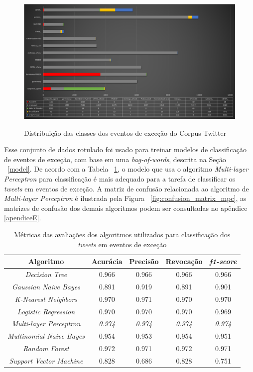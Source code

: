 \documentclass[
	12pt,				%
	oneside,			%
	a4paper,			%
	english,			%
	brazil				%
	]{abntex2ppgsi}
\begin{document}
\begin{figure}[!htb]
	\centering
 	  \caption{Distribuição das classes dos eventos de exceção do Corpus Twitter}
		\includegraphics[width=1\linewidth]{images/tweets_distribution.png}
	\label{fig:tweets_distribution}
\end{figure}

Esse conjunto de dados rotulado foi usado para treinar modelos de classificação de eventos de exceção, com base em uma \textit{bag-of-words}, descrita na Seção ~\ref{model}. De acordo com a Tabela ~\ref{tab:metrics}, o modelo que usa o algoritmo \textit{Multi-layer Perceptron} para classificação é mais adequado para a tarefa de classificar os \textit{tweets} em eventos de exceção. A matriz de confusão relacionada ao algoritmo de \textit{Multi-layer Perceptron} é ilustrada pela Figura ~\ref{fig:confusion_matrix_mpc}, as matrizes de confusão dos demais algoritmos podem ser consultadas no apêndice \ref{apendiceE}.

\begin{table}[!htb]
\centering
\caption {Métricas das avaliações dos algoritmos utilizados para classificação dos \textit{tweets} em eventos de exceção}
\label {tab:metrics}
\begin{tabular}{c|c|c|c|c}
\hline
\textbf{Algoritmo} & \textbf{Acurácia} & \textbf{Precisão} & \textbf{Revocação} & \textbf{\textit{f1-score}} \\
\hline
\textit{Decision Tree} & 0.966 & 0.966 & 0.966 & 0.966 \\
\hline
\textit{Gaussian Naive Bayes} & 0.891 & 0.919 & 0.891 & 0.901 \\
\hline
\textit{K-Nearest Neighbors} & 0.970 & 0.971 & 0.970 & 0.970 \\
\hline
\textit{Logistic Regression} & 0.970 & 0.970 & 0.970 & 0.969 \\
\hline
\textit{Multi-layer Perceptron} & \textit{0.974} & \textit{0.974} & \textit{0.974} & \textit{0.974} \\
\hline
\textit{Multinomial Naive Bayes} & 0.954 & 0.953 & 0.954 & 0.951 \\
\hline
\textit{Random Forest} & 0.972 & 0.971 & 0.972 & 0.971 \\
\hline
\textit{Support Vector Machine} & 0.828 & 0.686 & 0.828 & 0.751 \\
\hline
\end{tabular}
\end{table}
\end{document}
